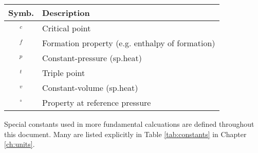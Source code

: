 \vspace{1em}
\begin{tabular}{|cl|}
\hline
Symb. & Description\\
\hline
$_c$ & Critical point\\
$_f$ & Formation property (e.g. enthalpy of formation)\\
$_p$ & Constant-pressure (sp.heat)\\
$_t$ & Triple point\\
$_v$ & Constant-volume (sp.heat)\\
$^\circ$ & Property at reference pressure\\
\hline
\end{tabular}

Special constants used in more fundamental calcuations are defined throughout this document.  Many are listed explicitly in Table \ref{tab:constants} in Chapter \ref{ch:units}.
